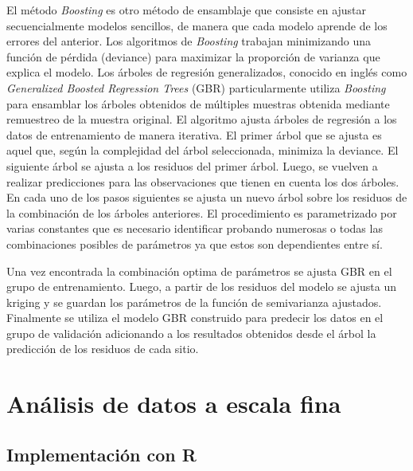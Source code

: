 \documentclass[11pt,b5paper,]{krantz}
\begin{document}
El método \emph{Boosting} es otro método de ensamblaje que consiste en ajustar secuencialmente modelos sencillos, de manera que cada modelo aprende de los errores del anterior. Los algoritmos de \emph{Boosting} trabajan minimizando una función de pérdida (deviance) para maximizar la proporción de varianza que explica el modelo. Los árboles de regresión generalizados, conocido en inglés como \emph{Generalized Boosted Regression Trees} (GBR) particularmente utiliza \emph{Boosting} para ensamblar los árboles obtenidos de múltiples muestras obtenida mediante remuestreo de la muestra original. El algoritmo ajusta árboles de regresión a los datos de entrenamiento de manera iterativa. El primer árbol que se ajusta es aquel que, según la complejidad del árbol seleccionada, minimiza la deviance. El siguiente árbol se ajusta a los residuos del primer árbol. Luego, se vuelven a realizar predicciones para las observaciones que tienen en cuenta los dos árboles. En cada uno de los pasos siguientes se ajusta un nuevo árbol sobre los residuos de la combinación de los árboles anteriores. El procedimiento es parametrizado por varias constantes que es necesario identificar probando numerosas o todas las combinaciones posibles de parámetros ya que estos son dependientes entre sí.

Una vez encontrada la combinación optima de parámetros se ajusta GBR en el grupo de entrenamiento. Luego, a partir de los residuos del modelo se ajusta un kriging y se guardan los parámetros de la función de semivarianza ajustados. Finalmente se utiliza el modelo GBR construido para predecir los datos en el grupo de validación adicionando a los resultados obtenidos desde el árbol la predicción de los residuos de cada sitio.

\cleardoublepage

\hypertarget{part-anuxe1lisis-de-datos-a-escala-fina}{%
\part{Análisis de datos a escala fina}\label{part-anuxe1lisis-de-datos-a-escala-fina}}

\setcounter{chapter}{0}

\hypertarget{implementaciuxf3n-con-r}{%
\chapter{Implementación con R}\label{implementaciuxf3n-con-r}}
\end{document}
